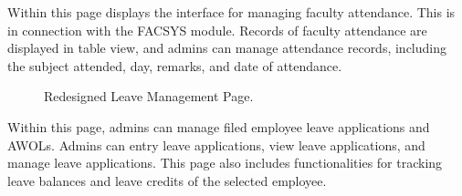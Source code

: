     Within this page displays the interface for managing faculty attendance. This is in connection with the FACSYS module. Records of faculty attendance are displayed in table view, and admins can manage attendance records, including the subject attended, day, remarks, and date of attendance.

    \begin{figure}[H]
        \centering
        \caption{Redesigned Leave Management Page.}
        \label{fig:leave-mgt}
    \end{figure}

    Within this page, admins can manage filed employee leave applications and AWOLs. Admins can entry leave applications, view leave applications, and manage leave applications. This page also includes functionalities for tracking leave balances and leave credits of the selected employee.

